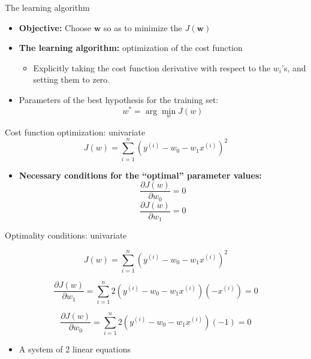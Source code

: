 \documentclass[serif, aspectratio=169]{beamer}
\begin{document}
\begin{frame}{The learning algorithm}

    \begin{itemize}
        \item \textbf{Objective:} Choose \( \mathbf{w} \) so as to minimize the \( J(\mathbf{w}) \)
    
        \item \textbf{The learning algorithm:} optimization of the cost function
        \begin{itemize}
            \item Explicitly taking the cost function derivative with respect to the \( w_i \)'s, and setting them to zero.
        \end{itemize}
        
        \item Parameters of the best hypothesis for the training set:
        \[
        w^* = \arg \min_{w} J(w)
        \]
    \end{itemize}
\end{frame}




\begin{frame}{Cost function optimization: univariate}
    \[
    J(w) = \sum_{i=1}^{n} \left( y^{(i)} - w_0 - w_1 x^{(i)} \right)^2
    \]
    
    \begin{itemize}
        \item \textbf{Necessary conditions for the “optimal” parameter values:}
        \[
        \frac{\partial J(w)}{\partial w_0} = 0
        \]
        \[
        \frac{\partial J(w)}{\partial w_1} = 0
        \]
    \end{itemize}

\end{frame}




\begin{frame}{Optimality conditions: univariate}

    \[
    J(w) = \sum_{i=1}^{n} \left( y^{(i)} - w_0 - w_1 x^{(i)} \right)^2
    \]
    
    \[
    \frac{\partial J(w)}{\partial w_1} = \sum_{i=1}^{n} 2 \left( y^{(i)} - w_0 - w_1 x^{(i)} \right) (-x^{(i)}) = 0
    \]
    
    \[
    \frac{\partial J(w)}{\partial w_0} = \sum_{i=1}^{n} 2 \left( y^{(i)} - w_0 - w_1 x^{(i)} \right) (-1) = 0
    \]
    
    \begin{itemize}
        \item A system of 2 linear equations
    \end{itemize}

\end{frame}
\end{document}
